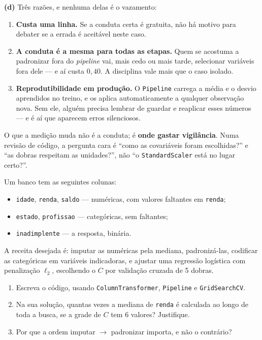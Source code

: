 \documentclass[11pt,a4paper]{article}
\begin{document}
\begin{solucao}
\smallskip
\textbf{(d)} Três razões, e nenhuma delas é o vazamento:
\begin{enumerate}[label=(\roman*),leftmargin=1.1cm]
  \item \textbf{Custa uma linha.} Se a conduta certa é gratuita, não há motivo
        para debater se a errada é aceitável neste caso.
  \item \textbf{A conduta é a mesma para todas as etapas.} Quem se acostuma a
        padronizar fora do \emph{pipeline} vai, mais cedo ou mais tarde,
        selecionar variáveis fora dele --- e aí custa $0{,}40$. A disciplina vale
        mais que o caso isolado.
  \item \textbf{Reprodutibilidade em produção.} O \texttt{Pipeline} carrega a
        média e o desvio aprendidos no treino, e os aplica automaticamente a
        qualquer observação nova. Sem ele, alguém precisa lembrar de guardar e
        reaplicar esses números --- e é aí que aparecem erros silenciosos.
\end{enumerate}
O que a medição muda não é a conduta; é \textbf{onde gastar vigilância}. Numa
revisão de código, a pergunta cara é ``como as covariáveis foram escolhidas?'' e
``as dobras respeitam as unidades?'', não ``o \texttt{StandardScaler} está no
lugar certo?''.
\end{solucao}

\begin{exercicio}
Um banco tem as seguintes colunas:
\begin{itemize}[leftmargin=1.4cm]
  \item \texttt{idade}, \texttt{renda}, \texttt{saldo} --- numéricas, com valores
        faltantes em \texttt{renda};
  \item \texttt{estado}, \texttt{profissao} --- categóricas, sem faltantes;
  \item \texttt{inadimplente} --- a resposta, binária.
\end{itemize}
A receita desejada é: imputar as numéricas pela mediana, padronizá-las, codificar
as categóricas em variáveis indicadoras, e ajustar uma regressão logística com
penalização $\ell_2$, escolhendo o $C$ por validação cruzada de 5 dobras.
\begin{enumerate}[label=(\alph*),leftmargin=1.1cm]
  \item Escreva o código, usando \texttt{ColumnTransformer}, \texttt{Pipeline} e
        \texttt{GridSearchCV}.
  \item Na sua solução, quantas vezes a mediana de \texttt{renda} é calculada ao
        longo de toda a busca, se a grade de $C$ tem $6$ valores? Justifique.
  \item Por que a ordem imputar $\to$ padronizar importa, e não o contrário?
\end{enumerate}
\end{exercicio}
\end{document}
